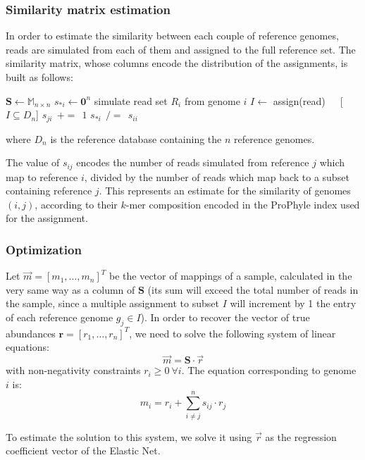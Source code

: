 \subsubsection{Similarity matrix estimation}
In order to estimate the similarity between each couple of reference genomes, reads are simulated from each of them and assigned to the full reference set. The similarity matrix, whose columns encode the distribution of the assignments, is built as follows:
\begin{algorithmic}
\State $\mathbf{S} \gets \mathbb{M}_{n\times n}$
\State $s_{*i} \gets \mathbf{0}^n$
\State simulate read set $R_i$ from genome $i$
\State $I \gets$ assign(read)~~~[$I \subseteq D_n$]
\State $s_{ji}~~{+=}~~1$
\EndFor
\EndFor
$s_{*i}~~{/=}~~s_{ii}$
\EndFor
\end{algorithmic}
where $D_n$ is the reference database containing the $n$ reference genomes.

The value of $s_{ij}$ encodes the number of reads simulated from reference $j$ which map to reference $i$, divided by the number of reads which map back to a subset containing reference $j$. This represents an estimate for the similarity of genomes $(i,j)$, according to their $k$-mer composition encoded in the ProPhyle index used for the assignment.

\subsubsection{Optimization}
Let $\vec{m} = [m_1, \dots, m_n]^T$ be the vector of mappings of a sample, calculated in the very same way as a column of $\boldsymbol{S}$ (its sum will exceed the total number of reads in the sample, since a multiple assignment to subset $I$ will increment by 1 the entry of each reference genome $g_j \in I$). In order to recover the vector of true abundances $\mathbf{r} = [r_1, \dots, r_n]^T$, we need to solve the following system of linear equations:
\begin{equation*}
  \vec{m} = \boldsymbol{S} \cdot \vec{r}
\end{equation*}
with non-negativity constraints $r_i \geq 0~\forall i$. The equation corresponding to genome $i$ is:
\begin{equation*}
  m_i = r_i + \sum_{i \neq j}^n s_{ij} \cdot r_j
\end{equation*}

To estimate the solution to this system, we solve it using $\vec{r}$ as the regression coefficient vector of the Elastic Net.

